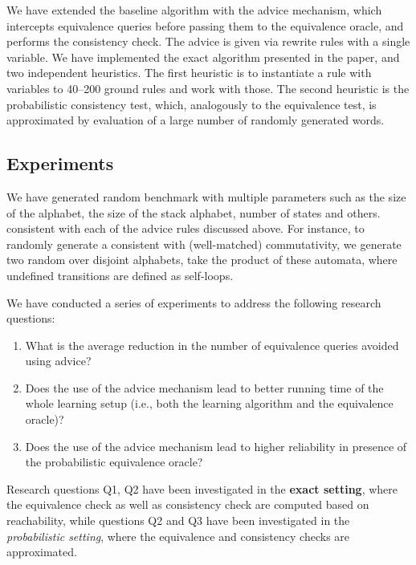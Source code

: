 We have extended the baseline algorithm with the advice mechanism, which intercepts equivalence queries before
passing them to the equivalence oracle, and performs the consistency check.
The advice is given via rewrite rules with a {single} variable.
We have implemented the exact algorithm presented in the paper, and two independent heuristics. 
The first heuristic is to instantiate a rule with variables to 40--200 ground rules and work with those.
The second heuristic is the probabilistic consistency test, which, analogously to the equivalence test, is
approximated by evaluation of a large number of randomly generated words.
 

\subsection{Experiments}

We have generated random benchmark \DVPA with multiple parameters such as the size of the alphabet, 
the size of the stack alphabet, number of states and others.
consistent with each of the advice rules discussed above. For instance, to randomly generate 
a \DVPA consistent with {(well-matched) commutativity}, we generate two random \DVPA over disjoint alphabets, take the product of these automata, where undefined transitions are defined as self-loops. 

We have conducted a series of experiments to address the following research questions:
\begin{enumerate}[Q1]
\item What is the average reduction in the number of equivalence queries avoided using advice? 
\item Does the use of the advice mechanism lead to better running time of the whole learning setup 
(i.e., both the learning algorithm and the equivalence oracle)? 
\item Does the use of the advice mechanism lead to higher reliability in presence of
the probabilistic equivalence oracle?
\end{enumerate}

Research questions Q1, Q2 have been investigated in the \textbf{exact setting}, where the equivalence check as well as consistency check are 
computed based on  reachability, while questions Q2 and Q3 have been investigated in the \emph{probabilistic setting}, where 
the equivalence and consistency checks are approximated.



